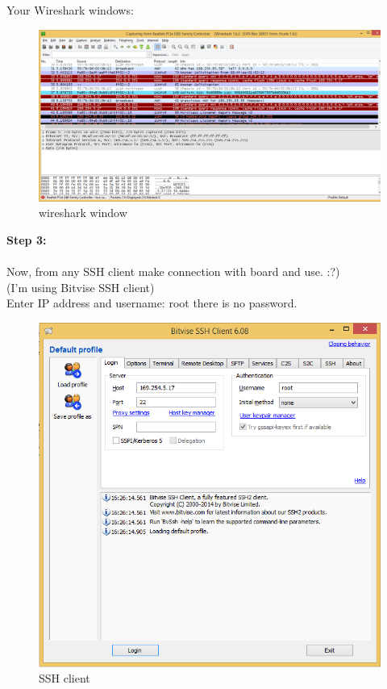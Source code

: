 \documentclass[11pt,a4paper]{article}
\begin{document}
Your Wireshark windows:\\
\begin{figure}
  \includegraphics[width=\linewidth]{3.png}
  \caption{wireshark window}
\end{figure}
\newpage
	\textbf{Step 3:}\\
	\vspace{.3cm}\\
	Now, from any SSH client make connection with board and use. :?)\\
(I’m using Bitvise SSH client)\\
Enter IP address and username: root there is no password.\\
\begin{figure}
  \includegraphics[width=\linewidth]{4.png}
  \caption{SSH client}
\end{figure}
\end{document}
